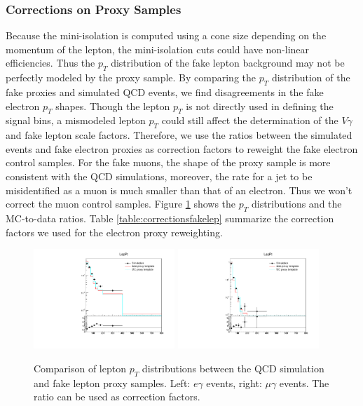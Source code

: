 \documentclass[thesis.tex]{subfiles}
\renewcommand\_{\textunderscore\allowbreak}
\begin{document}
\subsubsection{Corrections on Proxy Samples}
Because the mini-isolation is computed using a cone size depending on the momentum of the lepton, the mini-isolation cuts could have non-linear efficiencies. Thus the $p_T$ distribution of the fake lepton background may not be perfectly modeled by the proxy sample. By comparing the $p_T$ distribution of the fake proxies and simulated QCD events, we find disagreements in the fake electron $p_T$ shapes. Though the lepton $p_T$ is not directly used in defining the signal bins, a mismodeled lepton $p_T$ could still affect the determination of the $V\gamma$ and fake lepton scale factors. Therefore, we use the ratios between the simulated events and fake electron proxies as correction factors to reweight the fake electron control samples. For the fake muons, the shape of the proxy sample is more consistent with the QCD simulations, moreover, the rate for a jet to be misidentified as a muon is much smaller than that of an electron. Thus we won't correct the muon control samples. 
Figure \ref{fig:reweight_fakelep} shows the $p_T$ distributions and the MC-to-data ratios. Table \ref{table:correctionsfakelep} summarize the correction factors we used for the electron proxy reweighting.

\begin{figure}[hbtp]\begin{center}
    \includegraphics[width=0.475\textwidth]{Figures/faketemp_electron_LepPt.pdf}
    \includegraphics[width=0.475\textwidth]{Figures/faketemp_muon_LepPt.pdf}
    \caption{Comparison of lepton $p_T$ distributions between the QCD simulation and fake lepton proxy samples. Left: $e\gamma$ events, right: $\mu\gamma$ events. The ratio can be used as correction factors.}
        \label{fig:reweight_fakelep}
\end{center}\end{figure}
\end{document}
